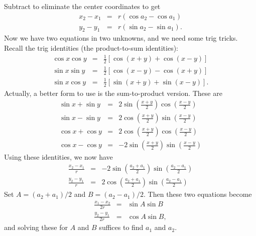 \documentclass[titlepage,oneside,10pt]{article}
\begin{document}
Subtract to eliminate the center coordinates to get
\begin{eqnarray*}
x_2 - x_1 &=& r(\cos a_2 - \cos a_1)\\
y_2 - y_1 &=& r(\sin a_2 - \sin a_1).
\end{eqnarray*}
Now we have two equations in two unknowns, and we need some trig
tricks. Recall the trig identities (the product-to-sum identities):
\begin{eqnarray*}
\cos x\cos y &=& \frac{1}{2}[\cos(x+y)+\cos(x-y)]\\
\sin x\sin y &=& \frac{1}{2}[\cos(x-y)-\cos(x+y)]\\
\sin x\cos y &=& \frac{1}{2}[\sin(x+y)+\sin(x-y)].
\end{eqnarray*}
Actually, a better form to use is the sum-to-product version. These
are
\begin{eqnarray*}
\sin x + \sin y &=&
2\sin\left(\frac{x+y}{2}\right) \cos\left(\frac{x-y}{2}\right)\\
\sin x - \sin y &=&
2\cos\left(\frac{x+y}{2}\right) \sin\left(\frac{x-y}{2}\right)\\
\cos x + \cos y &=&
2\cos\left(\frac{x+y}{2}\right) \cos\left(\frac{x-y}{2}\right)\\
\cos x - \cos y &=&
-2\sin\left(\frac{x+y}{2}\right) \sin\left(\frac{x-y}{2}\right)
\end{eqnarray*}
Using these identities, we now have
\begin{eqnarray*}
\frac{x_2-x_1}{r} &=& -2\sin\left(\frac{a_2+a_1}{2}\right)
\sin\left(\frac{a_2-a_1}{2}\right)\\
\frac{y_2-y_1}{r} &=&  2\cos\left(\frac{a_2+a_1}{2}\right)
\sin\left(\frac{a_2-a_1}{2}\right)
\end{eqnarray*}
Set $A=(a_2+a_1)/2$ and $B=(a_2-a_1)/2$. Then these two equations
become
\begin{eqnarray*}
\frac{x_1-x_2}{2r} &=& \sin A \sin B\\
\frac{y_2-y_1}{2r} &=& \cos A \sin B,
\end{eqnarray*}
and solving these for $A$ and $B$ suffices to find $a_1$ and $a_2$.
\end{document}

